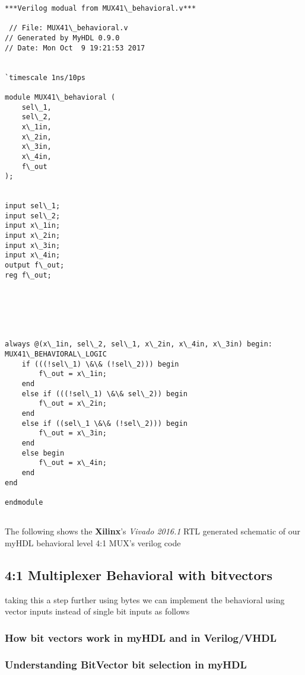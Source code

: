 \documentclass[11pt]{article}
\begin{document}
    \begin{Verbatim}[commandchars=\\\{\}]
***Verilog modual from MUX41\_behavioral.v***

 // File: MUX41\_behavioral.v
// Generated by MyHDL 0.9.0
// Date: Mon Oct  9 19:21:53 2017


`timescale 1ns/10ps

module MUX41\_behavioral (
    sel\_1,
    sel\_2,
    x\_1in,
    x\_2in,
    x\_3in,
    x\_4in,
    f\_out
);


input sel\_1;
input sel\_2;
input x\_1in;
input x\_2in;
input x\_3in;
input x\_4in;
output f\_out;
reg f\_out;






always @(x\_1in, sel\_2, sel\_1, x\_2in, x\_4in, x\_3in) begin: MUX41\_BEHAVIORAL\_LOGIC
    if (((!sel\_1) \&\& (!sel\_2))) begin
        f\_out = x\_1in;
    end
    else if (((!sel\_1) \&\& sel\_2)) begin
        f\_out = x\_2in;
    end
    else if ((sel\_1 \&\& (!sel\_2))) begin
        f\_out = x\_3in;
    end
    else begin
        f\_out = x\_4in;
    end
end

endmodule


    \end{Verbatim}

    The following shows the \textbf{Xilinx}'s \emph{Vivado 2016.1} RTL
generated schematic of our myHDL behavioral level 4:1 MUX's verilog code

    \subsection{4:1 Multiplexer Behavioral with
bitvectors}\label{multiplexer-behavioral-with-bitvectors}

    taking this a step further using bytes we can implement the behavioral
using vector inputs instead of single bit inputs as follows

    \subsubsection{How bit vectors work in myHDL and in
Verilog/VHDL}\label{how-bit-vectors-work-in-myhdl-and-in-verilogvhdl}

    \subsubsection{Understanding BitVector bit selection in
myHDL}\label{understanding-bitvector-bit-selection-in-myhdl}
\end{document}
